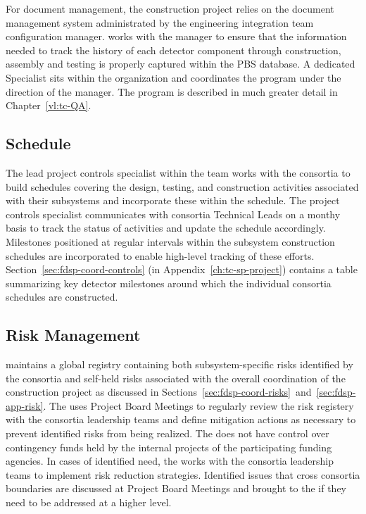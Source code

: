 For document management, the  construction project 
relies on the  document management system 
administrated by the  engineering integration team 
configuration manager.   works with the  
 manager to ensure that the information needed to track 
the history of each detector component through construction, 
assembly and testing is properly captured within the PBS 
database.  A dedicated   Specialist 
sits within the  organization and coordinates the 
  program under the direction of the
  manager.  The  
 program is described in much greater detail in 
Chapter~\ref{vl:tc-QA}.
 
\subsection{Schedule}

The lead project controls specialist within the  team works
with the  consortia to build schedules covering
the design, testing, and construction activities associated with their
subsystems and incorporate these within the 
schedule.  The project controls specialist communicates with consortia
Technical Leads on a monthy basis to track the status of activities
and update the  schedule accordingly.  Milestones
positioned at regular intervals within the subsystem construction
schedules are incorporated to enable high-level tracking of these
efforts.  Section~\ref{sec:fdsp-coord-controls} (in
Appendix~\ref{ch:tc-sp-project}) contains a table summarizing key
detector milestones around which the individual consortia
schedules are constructed.

\subsection{Risk Management}

  maintains a global registry containing both
subsystem-specific risks identified by the consortia and self-held
risks associated with the overall coordination of the 
construction project as discussed in
Sections~\ref{sec:fdsp-coord-risks}~and~\ref{sec:fdsp-app-risk}.  The
 uses Project Board Meetings to regularly review the
risk registery with the consortia leadership teams and define
mitigation actions as necessary to prevent identified risks from being
realized.  The  does not have control over
contingency funds held by the internal projects of the participating
funding agencies.  In cases of identified need, the 
works with the consortia leadership teams to implement risk
reduction strategies.  Identified issues that cross consortia
boundaries are discussed at Project Board Meetings and brought to the
  if they need to be addressed at a higher
level.


